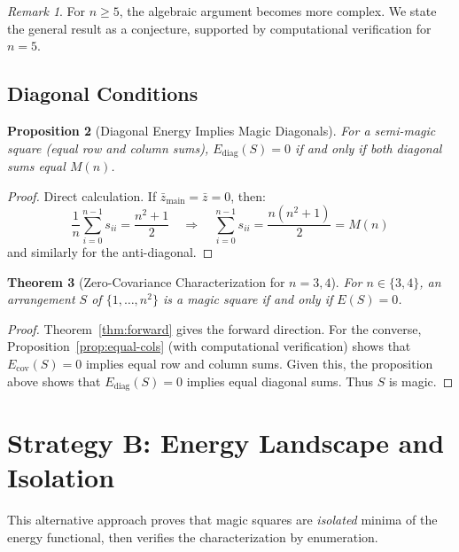 \documentclass[11pt]{article}
\newtheorem{theorem}{Theorem}[section]
\newtheorem{proposition}[theorem]{Proposition}
\theoremstyle{definition}
\theoremstyle{remark}
\newtheorem{remark}[theorem]{Remark}
\begin{document}
\begin{remark}
For $n \geq 5$, the algebraic argument becomes more complex. We state the general result as a conjecture, supported by computational verification for $n = 5$.
\end{remark}

\subsection{Diagonal Conditions}

\begin{proposition}[Diagonal Energy Implies Magic Diagonals]
For a semi-magic square (equal row and column sums), $E_{\text{diag}}(S) = 0$ if and only if both diagonal sums equal $M(n)$.
\end{proposition}

\begin{proof}
Direct calculation. If $\bar{z}_{\text{main}} = \bar{z} = 0$, then:
\[
\frac{1}{n} \sum_{i=0}^{n-1} s_{ii} = \frac{n^2+1}{2} \quad \Longrightarrow \quad \sum_{i=0}^{n-1} s_{ii} = \frac{n(n^2+1)}{2} = M(n)
\]
and similarly for the anti-diagonal.
\end{proof}

\begin{theorem}[Zero-Covariance Characterization for $n=3,4$]\label{thm:main-n34}
For $n \in \{3, 4\}$, an arrangement $S$ of $\{1, \ldots, n^2\}$ is a magic square if and only if $E(S) = 0$.
\end{theorem}

\begin{proof}
Theorem~\ref{thm:forward} gives the forward direction. For the converse, Proposition~\ref{prop:equal-cols} (with computational verification) shows that $E_{\text{cov}}(S) = 0$ implies equal row and column sums. Given this, the proposition above shows that $E_{\text{diag}}(S) = 0$ implies equal diagonal sums. Thus $S$ is magic.
\end{proof}

\section{Strategy B: Energy Landscape and Isolation}

This alternative approach proves that magic squares are \emph{isolated} minima of the energy functional, then verifies the characterization by enumeration.
\end{document}

